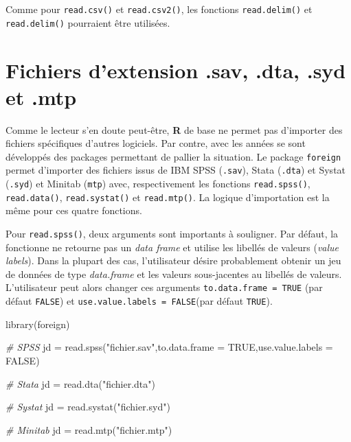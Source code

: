 \documentclass[
]{book}
\newenvironment{Shaded}{}{}
\newcommand{\AttributeTok}[1]{#1}
\newcommand{\CommentTok}[1]{\textit{#1}}
\newcommand{\ConstantTok}[1]{#1}
\newcommand{\FunctionTok}[1]{#1}
\newcommand{\NormalTok}[1]{#1}
\newcommand{\OtherTok}[1]{#1}
\newcommand{\StringTok}[1]{#1}
\begin{document}
\begin{Shaded}
\end{Shaded}

Comme pour \texttt{read.csv()} et \texttt{read.csv2()}, les fonctions \texttt{read.delim()} et \texttt{read.delim()} pourraient être utilisées.

\hypertarget{fichiers-dextension-.sav-.dta-.syd-et-.mtp}{%
\section{Fichiers d'extension .sav, .dta, .syd et .mtp}\label{fichiers-dextension-.sav-.dta-.syd-et-.mtp}}

Comme le lecteur s'en doute peut-être, \textbf{R} de base ne permet pas d'importer des fichiers spécifiques d'autres logiciels. Par contre, avec les années se sont développés des packages permettant de pallier la situation. Le package \texttt{foreign} permet d'importer des fichiers issus de IBM SPSS (\texttt{.sav}), Stata (\texttt{.dta}) et Systat (\texttt{.syd}) et Minitab (\texttt{mtp}) avec, respectivement les fonctions \texttt{read.spss()}, \texttt{read.data()}, \texttt{read.systat()} et \texttt{read.mtp()}. La logique d'importation est la même pour ces quatre fonctions.

Pour \texttt{read.spss()}, deux arguments sont importants à souligner. Par défaut, la fonctionne ne retourne pas un \emph{data frame} et utilise les libellés de valeurs (\emph{value labels}). Dans la plupart des cas, l'utilisateur désire probablement obtenir un jeu de données de type \emph{data.frame} et les valeurs sous-jacentes au libellés de valeurs. L'utilisateur peut alors changer ces arguments \texttt{to.data.frame\ =\ TRUE} (par défaut \texttt{FALSE}) et \texttt{use.value.labels\ =\ FALSE}(par défaut \texttt{TRUE}).

\begin{Shaded}
\begin{Highlighting}[]
\FunctionTok{library}\NormalTok{(foreign)}

\CommentTok{\# SPSS}
\NormalTok{jd }\OtherTok{=} \FunctionTok{read.spss}\NormalTok{(}\StringTok{"fichier.sav"}\NormalTok{,}\AttributeTok{to.data.frame =} \ConstantTok{TRUE}\NormalTok{,}\AttributeTok{use.value.labels =} \ConstantTok{FALSE}\NormalTok{)}

\CommentTok{\# Stata}
\NormalTok{jd }\OtherTok{=} \FunctionTok{read.dta}\NormalTok{(}\StringTok{"fichier.dta"}\NormalTok{)}

\CommentTok{\# Systat}
\NormalTok{jd }\OtherTok{=} \FunctionTok{read.systat}\NormalTok{(}\StringTok{"fichier.syd"}\NormalTok{) }

\CommentTok{\# Minitab}
\NormalTok{jd }\OtherTok{=} \FunctionTok{read.mtp}\NormalTok{(}\StringTok{"fichier.mtp"}\NormalTok{)}
\end{Highlighting}
\end{Shaded}
\end{document}

